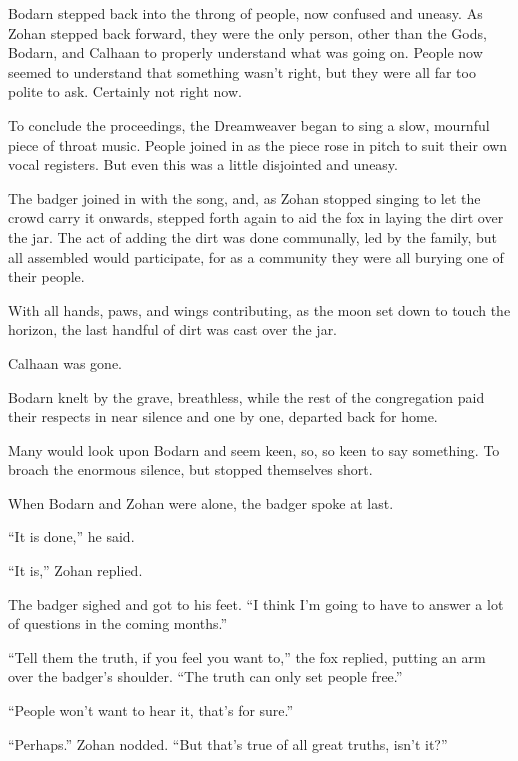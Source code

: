 Bodarn stepped back into the throng of people, now confused and uneasy. As Zohan stepped back forward, they were the only person, other than the Gods, Bodarn, and Calhaan to properly understand what was going on. People now seemed to understand that something wasn't right, but they were all far too polite to ask. Certainly not right now.

To conclude the proceedings, the Dreamweaver began to sing a slow, mournful piece of throat music. People joined in as the piece rose in pitch to suit their own vocal registers. But even this was a little disjointed and uneasy.

The badger joined in with the song, and, as Zohan stopped singing to let the crowd carry it onwards, stepped forth again to aid the fox in laying the dirt over the jar. The act of adding the dirt was done communally, led by the family, but all assembled would participate, for as a community they were all burying one of their people.

With all hands, paws, and wings contributing, as the moon set down to touch the horizon, the last handful of dirt was cast over the jar.

Calhaan was gone.

Bodarn knelt by the grave, breathless, while the rest of the congregation paid their respects in near silence and one by one, departed back for home.

Many would look upon Bodarn and seem keen, so, so keen to say something. To broach the enormous silence, but stopped themselves short.

When Bodarn and Zohan were alone, the badger spoke at last.

``It is done,'' he said.

``It is,'' Zohan replied.

The badger sighed and got to his feet. ``I think I'm going to have to answer a lot of questions in the coming months.''

``Tell them the truth, if you feel you want to,'' the fox replied, putting an arm over the badger's shoulder. ``The truth can only set people free.''

``People won't want to hear it, that's for sure.''

``Perhaps.'' Zohan nodded. ``But that's true of all great truths, isn't it?''
